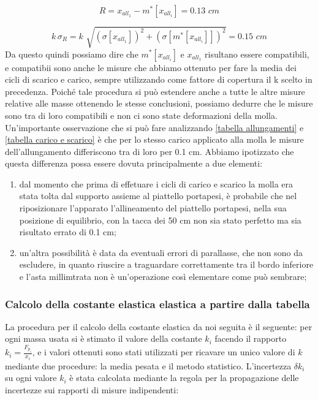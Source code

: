 \begin{equation*}
	R = x_{all_1} - m^*[x_{all_i}] = 0.13 \,\,cm
\end{equation*}

\begin{equation*}
	k\, \sigma_{R} = k\,\, \sqrt{(\sigma[x_{all_1}])^2 + (\sigma[m^*[x_{all_i}]])^2} = 0.15 \,\,cm
\end{equation*}
%
Da questo quindi possiamo dire che $m^*[x_{all_i}]$ e $x_{all_1}$ risultano essere compatibili, e compatibii sono anche le misure che abbiamo ottenuto per fare la media dei cicli di scarico e carico, sempre utilizzando come fattore di copertura il k scelto in precedenza.
Poiché tale procedura si può estendere anche a tutte le altre misure relative alle masse ottenendo le stesse conclusioni, possiamo dedurre che le misure sono tra di loro compatibili e non ci sono state deformazioni della molla.
Un'importante osservazione che si può fare analizzando \ref{tabella allungamenti} e \ref{tabella carico e scarico} è che per lo stesso carico applicato alla molla le misure dell'allungamento differiscono tra di loro per 0.1 cm. Abbiamo ipotizzato che questa differenza possa essere dovuta principalmente a due elementi:

\begin{enumerate}
	\item{dal momento che prima di effetuare i cicli di carico e scarico la molla era stata tolta dal supporto assieme al piattello portapesi, è probabile che nel riposizionare l'apparato l'allineamento del piattello portapesi, nella sua posizione di equilibrio, con la tacca dei 50 cm non sia stato perfetto ma sia risultato errato di 0.1 cm;}
	\item{un'altra possibilità è data da eventuali errori di parallasse, che non sono da escludere, in quanto riuscire a traguardare correttamente tra il bordo inferiore e l'asta millimtrata non è un'operazione così elementare come può sembrare;}
\end{enumerate}

\subsubsection{Calcolo della costante elastica elastica a partire dalla tabella}

La procedura per il calcolo della costante elastica da noi seguita è il seguente:
per ogni massa usata si è stimato il valore della costante $k_i$ facendo il rapporto $k_{i} = \frac{F_{p_{i}}}{x_{i}}$,
e i valori ottenuti sono stati utilizzati per ricavare un unico valore di $k$ mediante due procedure: la media pesata e il metodo statistico.
L'incertezza $\delta k_{i}$ su ogni valore $k_i$ è stata calcolata mediante la regola per la propagazione delle incertezze sui rapporti di misure indipendenti:

